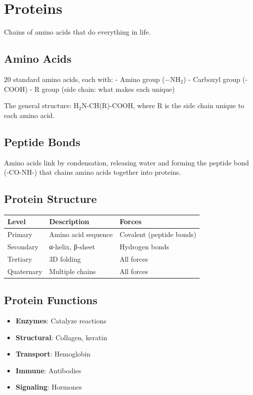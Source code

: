 \documentclass[
  11pt,
  letterpaper,
  twoside,
  openright]{book}
\providecommand{\tightlist}{%
  \setlength{\itemsep}{0pt}\setlength{\parskip}{0pt}}
\begin{document}
\section{Proteins}\label{proteins}

Chains of amino acids that do everything in life.

\subsection{Amino Acids}\label{amino-acids}

20 standard amino acids, each with: - Amino group (\(-\text{NH}_2\)) -
Carboxyl group (-COOH) - R group (side chain: what makes each unique)

The general structure: \(\text{H}_2\text{N}\)-CH(R)-COOH, where R is the
side chain unique to each amino acid.

\subsection{Peptide Bonds}\label{peptide-bonds}

Amino acids link by condensation, releasing water and forming the
peptide bond (-CO-NH-) that chains amino acids together into proteins.

\subsection{Protein Structure}\label{protein-structure}

\begin{longtable}[]{@{}lll@{}}
\toprule\noalign{}
Level & Description & Forces \\
\midrule\noalign{}
\endhead
\bottomrule\noalign{}
\endlastfoot
Primary & Amino acid sequence & Covalent (peptide bonds) \\
Secondary & α-helix, β-sheet & Hydrogen bonds \\
Tertiary & 3D folding & All forces \\
Quaternary & Multiple chains & All forces \\
\end{longtable}

\subsection{Protein Functions}\label{protein-functions}

\begin{itemize}
\tightlist
\item
  \textbf{Enzymes}: Catalyze reactions
\item
  \textbf{Structural}: Collagen, keratin
\item
  \textbf{Transport}: Hemoglobin
\item
  \textbf{Immune}: Antibodies
\item
  \textbf{Signaling}: Hormones
\end{itemize}
\end{document}
